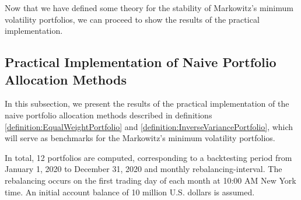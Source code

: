     	Now that we have defined some theory for the stability of Markowitz's minimum volatility portfolios, we can proceed to show the results of the practical implementation.
    	
        
    
    \subsection{Practical Implementation of Naive Portfolio Allocation Methods}\label{section:PracticalImplementationofNaivePortfolioAllocationMethods}
        In this subsection, we present the results of the practical implementation of the naive portfolio allocation methods described in definitions \ref{definition:EqualWeightPortfolio} and \ref{definition:InverseVariancePortfolio}, which will serve as benchmarks for the Markowitz's minimum volatility portfolios.
        
        
        In total, 12 portfolios are computed, corresponding to a backtesting period from January 1, 2020 to December 31, 2020 and monthly rebalancing-interval. The rebalancing occurs on the first trading day of each month at 10:00 AM New York time. An initial account balance of 10 million U.S. dollars is assumed.%
        
